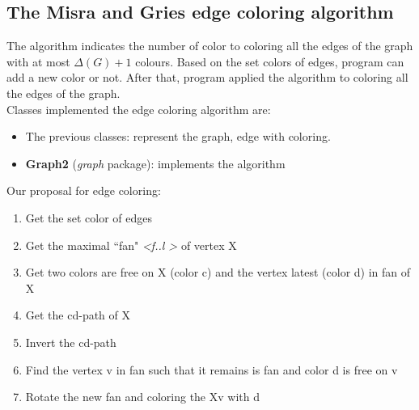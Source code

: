\subsection{The Misra and Gries edge coloring algorithm}
The algorithm indicates the number of color to coloring all the edges of the graph with at most $\Delta(G) + 1$ colours. Based on the set colors of edges, program can add a new color or not. After that, program applied the algorithm to coloring all the edges of the graph.
\\[0.5cm]
Classes implemented the edge coloring algorithm are:
\begin{itemize}
\item The previous classes: represent the graph, edge with coloring.
\item \textbf{Graph2} (\textit{graph} package): implements the algorithm
\end{itemize}
Our proposal for edge coloring:
\begin{enumerate}
\item Get the set color of edges
\item Get the maximal ``fan" \textit{\textless f..l \textgreater} of vertex X
\item Get two colors are free on X (color c) and the vertex latest (color d) in fan of X 
\item Get the cd-path of X
\item Invert the cd-path
\item Find the vertex v in fan such that it remains is fan and color d is free on v
\item Rotate the new fan and coloring the Xv with d
\end{enumerate}